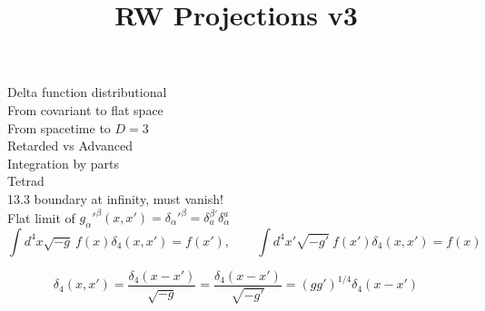 \documentclass[10pt,letterpaper]{article}
\title{RW Projections v3}
\date{}
\begin{document}
\maketitle
\noindent 
Delta function distributional\\
From covariant to flat space\\
From spacetime to $D=3$\\
Retarded vs Advanced\\
Integration by parts\\
Tetrad\\
13.3 boundary at infinity, must vanish!\\
Flat limit of $g_\alpha{}'^\beta(x,x')  = \delta_\alpha{}'^\beta = \delta^{\beta'}_a \delta^a_\alpha$
\begin{equation}
	\int d^4x\sqrt{-g}\  f(x)\delta_4(x,x') = f(x'),\qquad \int d^4x'\sqrt{-g'}\  f(x')\delta_4(x,x') = f(x)
\end{equation}

\begin{equation}
	\delta_4(x,x') = \frac{\delta_4(x-x')}{\sqrt{-g}} = \frac{\delta_4(x-x')}{\sqrt{-g'}} = (gg')^{1/4}\delta_4(x-x')
\end{equation}
\end{document}

